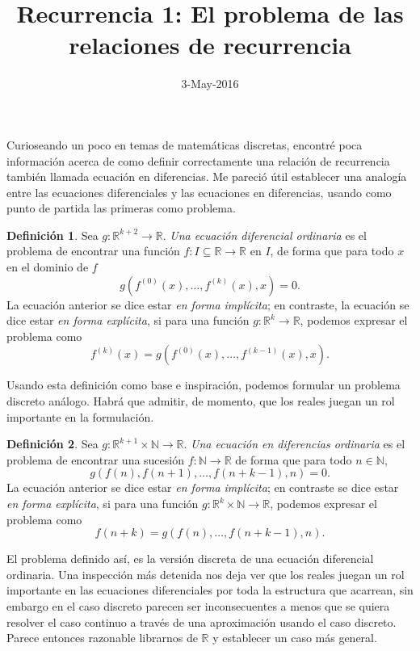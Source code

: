 \documentclass[letter,10pt,notitlepage]{amsart}
\title{Recurrencia 1: El problema de las relaciones de recurrencia}
\date{3-May-2016}
\theoremstyle{definition}
\newtheorem{definition}{Definición}
\theoremstyle{remark}
\begin{document}
\maketitle

Curioseando un poco en temas de matemáticas
discretas, encontré poca información acerca de
como definir correctamente una relación de recurrencia
también llamada ecuación en diferencias. Me pareció útil 
establecer una analogía entre las ecuaciones diferenciales
y las ecuaciones en diferencias, usando como punto de partida 
las primeras como  problema.

\begin{definition}
  Sea \( g \colon \mathbb{R}^{k+2} \to \mathbb{R}\). \emph{Una ecuación diferencial ordinaria}
  es el problema de encontrar una función \( f \colon I \subseteq \mathbb{R} \to \mathbb{R}\)
  en \( I\), de forma que para todo \( x\) en el dominio de \( f\)
  \[ g\left( f^{(0)}(x),\dots,f^{(k)}(x),x \right) = 0.\]
  La ecuación anterior se dice estar \emph{en forma implícita};
  en contraste, la ecuación se dice estar \emph{en forma explícita}, si para una función
  \( g \colon \mathbb{R}^k \to \mathbb{R}\), podemos expresar el problema
  como\[ f^{(k)}(x) = g\left( f^{(0)}(x),\dots,f^{(k-1)}(x),x \right).\]
\end{definition}

Usando esta definición como base e inspiración, podemos formular un problema
discreto análogo. Habrá que admitir, de momento, que los reales juegan un rol
importante en la formulación.

\begin{definition}
  Sea \( g \colon \mathbb{R}^{k+1} \times \mathbb{N} \to \mathbb{R}\).
  \emph{Una ecuación en diferencias ordinaria} es el problema de encontrar una
  sucesión \( f \colon \mathbb{N} \to \mathbb{R}\) de forma que
  para todo \( n \in \mathbb{N}\),
  \[ g(f(n), f(n+1), \dots, f(n+k-1),n) = 0.\]
  La ecuación anterior se dice estar \emph{en forma implícita}; en contraste
  se dice estar \emph{en forma explícita}, si para una función 
  \( g \colon \mathbb{R}^k \times \mathbb{N} \to \mathbb{R}\), 
  podemos expresar el problema como
  \[ f(n+k)=g( f(n), \dots, f(n+k-1),n).\]
\end{definition}

El problema definido así, es la versión discreta de una ecuación
diferencial ordinaria. Una inspección más detenida nos deja ver
que los reales juegan un rol importante en las ecuaciones diferenciales
por toda la estructura que acarrean, sin embargo en el caso discreto
parecen ser inconsecuentes a menos que se quiera resolver el caso
continuo a través de una aproximación usando el caso discreto.
Parece entonces razonable librarnos de \( \mathbb{R}\) y
establecer un caso más general.
\end{document}
